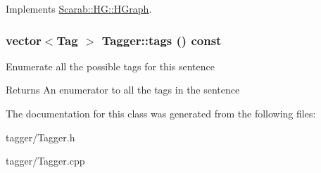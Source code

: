 Implements \hyperlink{class_scarab_1_1_h_g_1_1_h_graph_ab5aa11c932b28864b56f28e0babbc1c1}{Scarab::HG::HGraph}.

\hypertarget{class_tagger_ae1e3802fb545c3430ca4d52ea5fd95db}{
\subsubsection[{tags}]{\setlength{\rightskip}{0pt plus 5cm}vector$<${\bf Tag} $>$ Tagger::tags () const}}
\label{class_tagger_ae1e3802fb545c3430ca4d52ea5fd95db}
Enumerate all the possible tags for this sentence

\begin{DoxyReturn}{Returns}
An enumerator to all the tags in the sentence 
\end{DoxyReturn}


The documentation for this class was generated from the following files:\begin{DoxyCompactItemize}
\item 
tagger/Tagger.h\item 
tagger/Tagger.cpp\end{DoxyCompactItemize}
